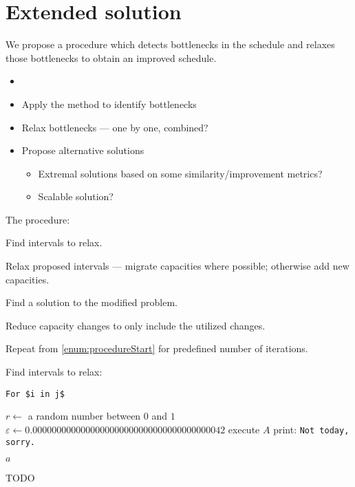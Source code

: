 \section{Extended solution} \label{sec:solution-apporach/extended-solution}

We propose a procedure which detects bottlenecks in the schedule and relaxes those bottlenecks to obtain
an improved schedule.

\begin{itemize}
    \item 

    \item Apply the method to identify bottlenecks
    \item Relax bottlenecks --- one by one, combined?
    \item Propose alternative solutions
    \begin{itemize}
        \item Extremal solutions based on some similarity/improvement metrics?
        \item Scalable solution?
    \end{itemize}
\end{itemize}

The procedure:

\begin{steps}
    \item Find intervals to relax. \label{enum:procedureStart}
    \item Relax proposed intervals --- migrate capacities where possible; otherwise add new capacities.
    \item Find a solution to the modified problem.
    \item Reduce capacity changes to only include the utilized changes.
    \item Repeat from \cref{enum:procedureStart} for predefined number of iterations.
\end{steps}

Find intervals to relax:

\begin{verbatim}
For $i in j$
\end{verbatim}


\algrenewcommand\algorithmicdo{\textbf{:}}
\algrenewcommand\algorithmicthen{\textbf{:}}
\algrenewcommand{}

\begin{algorithm}
\begin{algorithmic}
	\State $r \gets$ a random number between $0$ and $1$
	\State $\varepsilon \gets 0.0000000000000000000000000000000000000042$
		\State execute $A$ 
	\Else
		\State print: \texttt{Not today, sorry.}
        \EndIf


    \State $a$
\EndFunction
\end{algorithmic}
\caption{TODO}
\label{alg:findIntervalsToRelax}
\end{algorithm}
